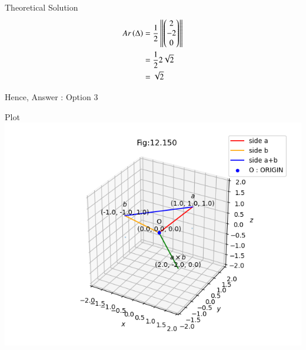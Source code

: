\documentclass{beamer}
\begin{document}
\begin{frame}{Theoretical Solution}
\begin{align}
    Ar\left(\Delta\right) &= \frac{1}{2}\left\lVert\begin{pmatrix}2\\-2\\0\end{pmatrix}\right\rVert\\
                    &= \frac{1}{2}2\sqrt{2}\\
                    &= \sqrt{2}
\end{align}

Hence, Answer : Option $3$
\end{frame}

\begin{frame}{Plot}
    \centering
    \includegraphics[width=\columnwidth, height=0.8\textheight, keepaspectratio]{../figs/vector2.png}   
\end{frame}
\end{document}
